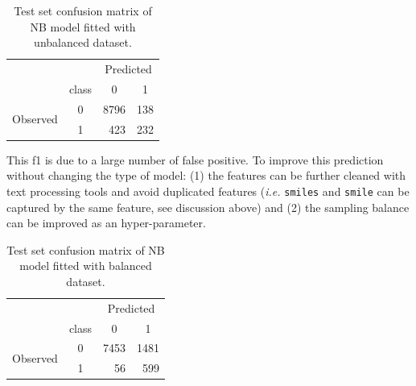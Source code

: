 \documentclass[a4paper, justified]{tufte-handout}
\begin{document}
\begin{fullwidth}
\begin{table}[]\label{NB1unbalanced}
\begin{center}
\begin{tabular}{llcr}
                                              &                            & \multicolumn{2}{c}{Predicted}                    \\
                                              & \multicolumn{1}{l|}{class} & 0                        & \multicolumn{1}{c}{1} \\ \cline{2-4} 
\multicolumn{1}{c}{\multirow{2}{*}{Observed}} & \multicolumn{1}{c|}{0}     & \multicolumn{1}{r}{8796} & 138                  \\
\multicolumn{1}{c}{}                          & \multicolumn{1}{c|}{1}     & \multicolumn{1}{r}{423  }   & 232                  
\end{tabular}
\caption{Test set confusion matrix of NB model fitted with unbalanced dataset.}
\end{center}
\end{table}

This f1 is due to a large number of false positive. To improve this prediction without changing the type of model: (1) the features can be further cleaned with text processing tools and avoid duplicated features (\textit{i.e.} \texttt{smiles} and \texttt{smile} can be captured by the same feature, see discussion above) and (2) the sampling balance can be improved as an hyper-parameter.

\begin{table}[]\label{NB1balanced}
\begin{center}
\begin{tabular}{llcr}
                                              &                            & \multicolumn{2}{c}{Predicted}                    \\
                                              & \multicolumn{1}{l|}{class} & 0                        & \multicolumn{1}{c}{1} \\ \cline{2-4} 
\multicolumn{1}{c}{\multirow{2}{*}{Observed}} & \multicolumn{1}{c|}{0}     & \multicolumn{1}{r}{7453} & 1481                  \\
\multicolumn{1}{c}{}                          & \multicolumn{1}{c|}{1}     & \multicolumn{1}{r}{56}   & 599                  
\end{tabular}
\caption{Test set confusion matrix of NB model fitted with balanced dataset.}
\end{center}
\end{table}


\end{fullwidth}
\end{document}

